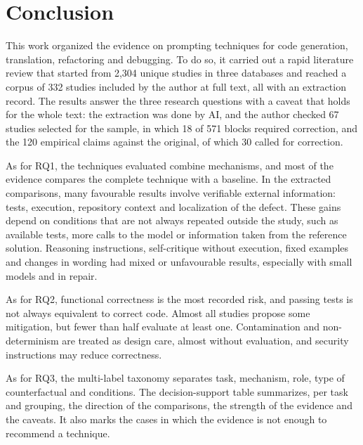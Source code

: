 \section{Conclusion}
This work organized the evidence on prompting techniques for code generation, translation, refactoring and
debugging. To do so, it carried out a rapid literature review that started from 2,304 unique studies in three databases and reached a
corpus of 332 studies included by the author at full text, all with an extraction record. The results
answer the three research questions with a caveat that holds for the whole text: the extraction was done by AI,
and the author
checked 67 studies selected for the sample, in which 18 of 571 blocks required correction, and the 120 empirical claims against the original, of which 30 called for correction.

As for RQ1, the techniques evaluated combine mechanisms, and most of the evidence compares the complete technique with
a baseline. In the extracted comparisons, many favourable results involve verifiable external
information: tests,
execution, repository context and localization of the defect. These gains depend on conditions that are not always
repeated outside the study, such as available tests, more calls to the model or information taken from the reference
solution. Reasoning instructions, self-critique without execution, fixed examples and changes in wording had
mixed or unfavourable results, especially with small models and in repair.

As for RQ2, functional correctness is the most recorded risk, and passing tests is not always equivalent to correct
code. Almost all studies propose some mitigation, but fewer than half evaluate at least one. Contamination and
non-determinism are treated as design care, almost without evaluation, and security instructions may reduce
correctness.

As for RQ3, the multi-label taxonomy separates task, mechanism, role, type of counterfactual and conditions. The decision-support
table summarizes, per task and grouping, the direction of the comparisons, the strength of the evidence and the caveats. It also
marks the cases in which the evidence is not enough to recommend a technique.


